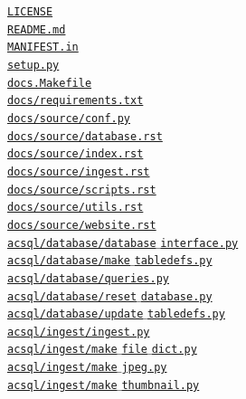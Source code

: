 \documentclass[10pt,journal,compsoc]{IEEEtran}
\begin{document}
\noindent \hyperlink{page.23}{\texttt{LICENSE}} \\
\noindent \hyperlink{page.23}{\texttt{README.md}} \\
\noindent \hyperlink{page.24}{\texttt{MANIFEST.in}} \\
\noindent \hyperlink{page.26}{\texttt{setup.py}} \\
\noindent \hyperlink{page.26}{\texttt{docs.Makefile}} \\
\noindent \hyperlink{page.26}{\texttt{docs/requirements.txt}} \\
\noindent \hyperlink{page.27}{\texttt{docs/source/conf.py}} \\
\noindent \hyperlink{page.29}{\texttt{docs/source/database.rst}} \\
\noindent \hyperlink{page.29}{\texttt{docs/source/index.rst}} \\
\noindent \hyperlink{page.30}{\texttt{docs/source/ingest.rst}} \\
\noindent \hyperlink{page.30}{\texttt{docs/source/scripts.rst}} \\
\noindent \hyperlink{page.30}{\texttt{docs/source/utils.rst}} \\
\noindent \hyperlink{page.30}{\texttt{docs/source/website.rst}} \\
\noindent \hyperlink{page.31}{\texttt{acsql/database/database$\_$interface.py}} \\
\noindent \hyperlink{page.36}{\texttt{acsql/database/make$\_$tabledefs.py}} \\
\noindent \hyperlink{page.38}{\texttt{acsql/database/queries.py}} \\
\noindent \hyperlink{page.42}{\texttt{acsql/database/reset$\_$database.py}} \\
\noindent \hyperlink{page.42}{\texttt{acsql/database/update$\_$tabledefs.py}} \\
\noindent \hyperlink{page.45}{\texttt{acsql/ingest/ingest.py}} \\
\noindent \hyperlink{page.49}{\texttt{acsql/ingest/make$\_$file$\_$dict.py}} \\
\noindent \hyperlink{page.51}{\texttt{acsql/ingest/make$\_$jpeg.py}} \\
\noindent \hyperlink{page.52}{\texttt{acsql/ingest/make$\_$thumbnail.py}} \\
\end{document}
